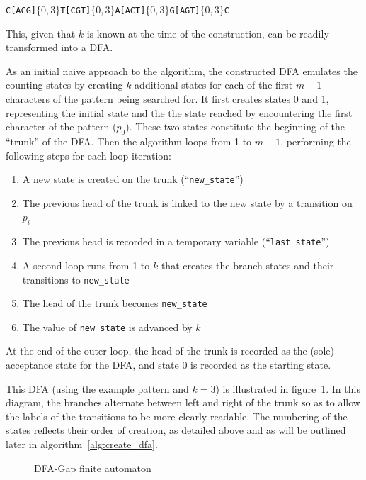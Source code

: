 \begin{center}
\texttt{C[ACG]$\lbrace 0,3 \rbrace$T[CGT]$\lbrace 0,3 \rbrace$A[ACT]$\lbrace 0,3 \rbrace$G[AGT]$\lbrace 0,3 \rbrace$C}
\end{center}

This, given that $k$ is known at the time of the construction, can be readily transformed into a DFA.

As an initial naive approach to the algorithm, the constructed DFA emulates the counting-states by creating $k$ additional states for each of the first $m - 1$ characters of the pattern being searched for. It first creates states 0 and 1, representing the initial state and the the state reached by encountering the first character of the pattern ($p_0$). These two states constitute the beginning of the ``trunk'' of the DFA. Then the algorithm loops from 1 to $m-1$, performing the following steps for each loop iteration:

\begin{enumerate}
\item A new state is created on the trunk (``\texttt{new\_state}'')
\item The previous head of the trunk is linked to the new state by a transition on $p_i$
\item The previous head is recorded in a temporary variable (``\texttt{last\_state}'')
\item A second loop runs from 1 to $k$ that creates the branch states and their transitions to \texttt{new\_state}
\item The head of the trunk becomes \texttt{new\_state}
\item The value of \texttt{new\_state} is advanced by $k$
\end{enumerate}

At the end of the outer loop, the head of the trunk is recorded as the (sole) acceptance state for the DFA, and state 0 is recorded as the starting state.

This DFA (using the example pattern and $k=3$) is illustrated in figure~\ref{fig:dfa_dfa}. In this diagram, the branches alternate between left and right of the trunk so as to allow the labels of the transitions to be more clearly readable. The numbering of the states reflects their order of creation, as detailed above and as will be outlined later in algorithm~\ref{alg:create_dfa}.

\begin{figure}[ht]
\centering

\caption{DFA-Gap finite automaton}
\label{fig:dfa_dfa}
\end{figure}

